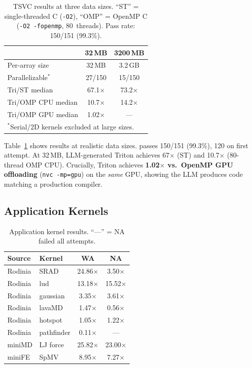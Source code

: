 \begin{table}[t]
  \caption{TSVC results at three data sizes.  ``ST'' = single-threaded
    C (\texttt{-O2}), ``OMP'' = OpenMP C (\texttt{-O2 -fopenmp},
    80~threads). Pass rate: 150/151 (99.3\%).}
  \label{tab:tsvc}
  \centering\small
  \begin{tabular}{lcc}
    \toprule
    & \textbf{32\,MB} & \textbf{3200\,MB} \\
    \midrule
    Per-array size     & 32\,MB & 3.2\,GB \\
    Parallelizable$^*$ & 27/150 & 15/150  \\
    \midrule
    Tri/ST median      & 67.1$\times$ & 73.2$\times$ \\
    Tri/OMP CPU median & 10.7$\times$ & 14.2$\times$ \\
    Tri/OMP GPU median & 1.02$\times$ & ---           \\
    \bottomrule
    \multicolumn{3}{l}{\scriptsize $^*$Serial/2D kernels excluded at large sizes.}
  \end{tabular}
\end{table}

Table~\ref{tab:tsvc} shows results at realistic data sizes.
\sysname passes 150/151 (99.3\%), 120 on first attempt.
At 32\,MB, LLM-generated Triton achieves 67$\times$ (ST)
and 10.7$\times$ (80-thread OMP CPU).  Crucially, Triton
achieves \textbf{1.02$\times$ vs.\ OpenMP GPU offloading}
(\texttt{nvc~-mp=gpu}) on the \emph{same} GPU, showing the
LLM produces code matching a production compiler.


\subsection{Application Kernels}
\label{sec:realworld}

\begin{table}[t]
  \caption{Application kernel results.  ``---'' = NA failed all attempts.}
  \label{tab:realworld}
  \centering\small
  \begin{tabular}{llcc}
    \toprule
    \textbf{Source} & \textbf{Kernel} & \textbf{WA} & \textbf{NA} \\
    \midrule
    Rodinia & SRAD       & 24.86$\times$ & 3.50$\times$ \\
    Rodinia & lud        & 13.18$\times$ & 15.52$\times$ \\
    Rodinia & gaussian   & 3.35$\times$  & 3.61$\times$ \\
    Rodinia & lavaMD     & 1.47$\times$  & 0.56$\times$ \\
    Rodinia & hotspot    & 1.05$\times$  & 1.22$\times$ \\
    Rodinia & pathfinder & 0.11$\times$  & --- \\
    \midrule
    miniMD  & LJ force   & 25.82$\times$ & 23.00$\times$ \\
    miniFE  & SpMV       & 8.95$\times$  & 7.27$\times$ \\
    \bottomrule
  \end{tabular}
\end{table}

